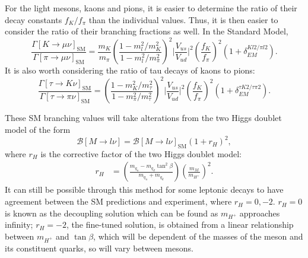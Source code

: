 \documentclass[a4paper,12pt]{article}
\begin{document}
For the light mesons, kaons and pions, it is easier to determine the ratio of their decay constants $f_K/f_\pi$ than the individual values.
Thus, it is then easier to consider the ratio of their branching fractions as well. 
In the Standard Model, 
\begin{equation}
    \label{eq:kpi}
    \frac{\Gamma[K\to\mu\nu]_{\text{SM}}}{\Gamma[\pi\to\mu\nu]_{\text{SM}}} = \frac{m_K}{m_\pi}\left(\frac{1-m_l^2/m_K^2}{1-m_l^2/m_\pi^2}\right)^2 \bigg|\frac{V_{us}}{V_{ud}}\bigg|^2\left(\frac{f_K}{f_\pi}\right)^2(1+\delta^{Kl2/\pi l2}_{EM}).
\end{equation}
It is also worth considering the ratio of tau decays of kaons to pions:
\begin{equation}
    \label{ep:tkpi}
    \frac{\Gamma[\tau\to K\nu]_{\text{SM}}}{\Gamma[\tau\to\pi\nu]_{\text{SM}}} = \left(\frac{1-m_K^2/m_\tau^2}{1-m_\pi^2/m_\tau^2}\right)^2\bigg|\frac{V_{us}}{V_{ud}}\bigg|^2\left(\frac{f_K}{f_\pi}\right)^2(1+\delta_{EM}^{\tau K2/\tau\pi2}).
\end{equation}

These SM branching values will take alterations from the two Higgs doublet model of the form
\begin{equation}
    \label{eq:mesrh}
    \mathcal{B}[M\to l\nu] = \mathcal{B}[M\to l\nu]_{\text{SM}}(1+r_H)^2,
\end{equation}
where $r_H$ is the corrective factor of the two Higgs doublet model:
\begin{align}
    \label{eq:rh}
    r_H &= \left(\frac{m_{q_u}-m_{q_d}\tan^2\beta}{m_{q_u}+m_{q_d}}\right)\left(\frac{m_M}{m_{H^+}}\right)^2.
\end{align}
It can still be possible through this method for some leptonic decays to have agreement between the SM predictions and experiment, where $r_H = 0,-2$.
$r_H=0$ is known as the decoupling solution which can be found as $m_{H^+}$ approaches infinity; $r_H=-2$, the fine-tuned solution, is obtained from a linear relationship between $m_{H^+}$ and $\tan\beta$, which will be dependent of the masses of the meson and its constituent quarks, so will vary between mesons. 
\end{document}
